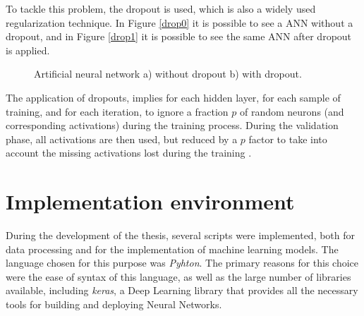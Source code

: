 To tackle this problem, the dropout is used, which is also a widely used regularization technique. In Figure \ref{drop0} it is possible to see a \ac{ANN} without a dropout, and in Figure \ref{drop1} it is possible to see the same \ac{ANN} after dropout is applied.

\begin{figure}[h!]
\captionsetup[subfigure]{position=b}
\centering
\label{fig:drop}
\hspace{0.05\textwidth}
\caption{Artificial neural network a) without dropout b) with dropout.}
\end{figure}

The application of dropouts, implies for each hidden layer, for each sample of training, and for each iteration, to ignore a fraction $p$ of random neurons (and corresponding activations) during the training process. During the validation phase, all activations are then used, but reduced by a $p$ factor to take into account the missing activations lost during the training \cite{drop0}.

\section{Implementation environment}\label{chap3:sec:implementation_enviromnet}

During the development of the thesis, several scripts were implemented, both for data processing and for the implementation of machine learning models. The language chosen for this purpose was \textit{Pyhton}. The primary reasons for this choice were the ease of syntax of this language, as well as the large number of libraries available, including \textit{keras}, a Deep Learning library that provides all the necessary tools for building and deploying Neural Networks.

